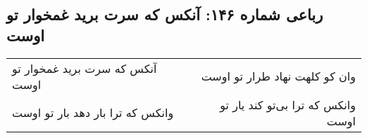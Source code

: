 \begin{center}
\section*{رباعی شماره ۱۴۶: آنکس که سرت برید غمخوار تو اوست}
\label{sec:0146}
\begin{longtable}{l p{0.5cm} r}
آنکس که سرت برید غمخوار تو اوست
&&
وان کو کلهت نهاد طرار تو اوست
\\
وانکس که ترا بار دهد بار تو اوست
&&
وانکس که ترا بی‌تو کند یار تو اوست
\\
\end{longtable}
\end{center}
